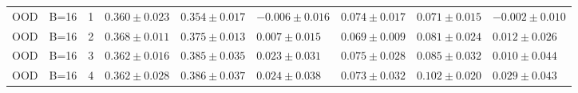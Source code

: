 \begin{table}[H]
\begin{tabular}{@{}lllllllll@{}}
OOD & B=16 & 1 & $0.360\pm0.023$ & $0.354\pm0.017$ & $-0.006\pm0.016$ & $0.074\pm0.017$ & $0.071\pm0.015$ & $-0.002\pm0.010$\\
OOD & B=16 & 2 & $0.368\pm0.011$ & $0.375\pm0.013$ & $0.007\pm0.015$ & $0.069\pm0.009$ & $0.081\pm0.024$ & $0.012\pm0.026$\\
OOD & B=16 & 3 & $0.362\pm0.016$ & $0.385\pm0.035$ & $0.023\pm0.031$ & $0.075\pm0.028$ & $0.085\pm0.032$ & $0.010\pm0.044$\\
OOD & B=16 & 4 & $0.362\pm0.028$ & $0.386\pm0.037$ & $0.024\pm0.038$ & $0.073\pm0.032$ & $0.102\pm0.020$ & $0.029\pm0.043$\\
\bottomrule
\end{tabular}
\end{table}
